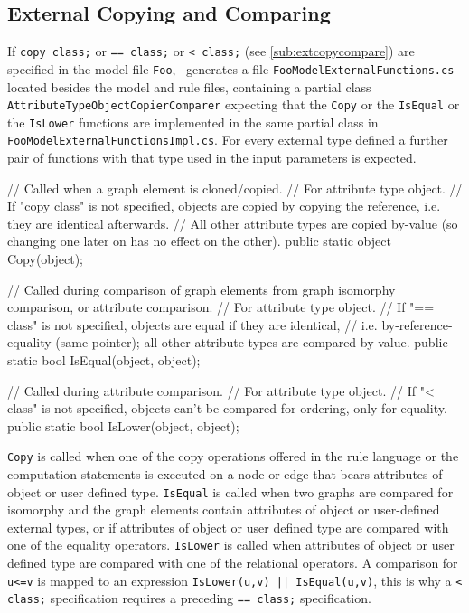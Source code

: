 \subsection*{External Copying and Comparing}\label{sub:apiextcopycompare}
If \texttt{copy class;} or \texttt{== class;} or \texttt{< class;} (see \ref{sub:extcopycompare}) are specified in the model file \texttt{Foo},
\GrG~generates a file \texttt{FooModelExternalFunctions.cs} located besides the model and rule files,
containing a partial class \texttt{AttributeTypeObjectCopierComparer} expecting that the \texttt{Copy} or the \texttt{IsEqual} or the \texttt{IsLower} functions are implemented in the same partial class in \texttt{FooModelExternalFunctionsImpl.cs}.
For every external type defined a further pair of functions with that type used in the input parameters is expected.

\begin{csharplet}
// Called when a graph element is cloned/copied.
// For attribute type object.
// If "copy class" is not specified, objects are copied by copying the reference, i.e. they are identical afterwards.
// All other attribute types are copied by-value (so changing one later on has no effect on the other).
public static object Copy(object);

// Called during comparison of graph elements from graph isomorphy comparison, or attribute comparison.
// For attribute type object.
// If "== class" is not specified, objects are equal if they are identical,
// i.e. by-reference-equality (same pointer); all other attribute types are compared by-value.
public static bool IsEqual(object, object);

// Called during attribute comparison.
// For attribute type object.
// If "< class" is not specified, objects can't be compared for ordering, only for equality.
public static bool IsLower(object, object);
\end{csharplet}

\texttt{Copy} is called when one of the copy operations offered in the rule language or the computation statements is executed on a node or edge that bears attributes of object or user defined type.
\texttt{IsEqual} is called when two graphs are compared for isomorphy and the graph elements contain attributes of object or user-defined external types, or if attributes of object or user defined type are compared with one of the equality operators.
\texttt{IsLower} is called when attributes of object or user defined type are compared with one of the relational operators.
A comparison for \texttt{u<=v} is mapped to an expression \verb#IsLower(u,v) || IsEqual(u,v)#, this is why a \verb#< class;# specification requires a preceding \verb#== class;# specification.

